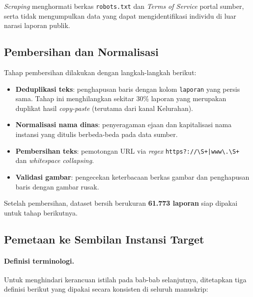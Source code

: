 \textit{Scraping} menghormati berkas \texttt{robots.txt} dan \textit{Terms of Service} portal sumber, serta tidak mengumpulkan data yang dapat mengidentifikasi individu di luar narasi laporan publik.

\subsection{Pembersihan dan Normalisasi}

Tahap pembersihan dilakukan dengan langkah-langkah berikut:

\begin{itemize}
    \item \textbf{Deduplikasi teks}: penghapusan baris dengan kolom \texttt{laporan} yang persis sama. Tahap ini menghilangkan sekitar 30\% laporan yang merupakan duplikat hasil \textit{copy-paste} (terutama dari kanal Kelurahan).
    \item \textbf{Normalisasi nama dinas}: penyeragaman ejaan dan kapitalisasi nama instansi yang ditulis berbeda-beda pada data sumber.
    \item \textbf{Pembersihan teks}: pemotongan URL via \textit{regex} \texttt{https?://\textbackslash S+|www\textbackslash .\textbackslash S+} dan \textit{whitespace collapsing}.
    \item \textbf{Validasi gambar}: pengecekan keterbacaan berkas gambar dan penghapusan baris dengan gambar rusak.
\end{itemize}

Setelah pembersihan, dataset bersih berukuran \textbf{61.773 laporan} siap dipakai untuk tahap berikutnya.

\subsection{Pemetaan ke Sembilan Instansi Target}

\paragraph{Definisi terminologi.} Untuk menghindari kerancuan istilah pada bab-bab selanjutnya, ditetapkan tiga definisi berikut yang dipakai secara konsisten di seluruh manuskrip:

